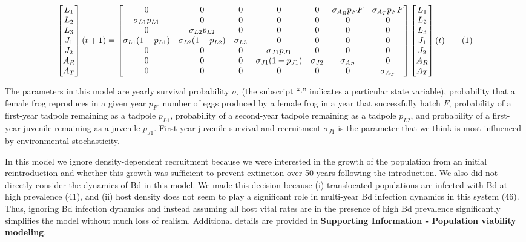 \documentclass[9pt,twocolumn,twoside,lineno]{pnas-new}
\begin{document}
{\begin{figure}\[
\begin{bmatrix}
L_1 \\
L_2 \\
L_3 \\
J_1 \\
J_2 \\
A_R \\ 
A_T
\end{bmatrix}(t + 1) = 
\begin{bmatrix}
  0 & 0 & 0 & 0 & 0 & \sigma_{A_R} p_F F & \sigma_{A_T} p_F F \\
  \sigma_{L1} p_{L1} & 0 & 0 & 0 & 0 & 0 & 0 \\
  0 & \sigma_{L2} p_{L2} & 0 & 0 & 0 & 0 & 0\\
  \sigma_{L1} (1 - p_{L1}) & \sigma_{L2} (1 - p_{L2}) & \sigma_{L3} & 0 & 0 & 0 & 0 \\
  0 & 0 & 0 & \sigma_{J1} p_{J1} & 0 & 0 & 0 \\
  0 & 0 & 0 & \sigma_{J1} (1 - p_{J1}) & \sigma_{J2}  & \sigma_{A_R} & 0 \\
  0 & 0 & 0 & 0 & 0 & 0 & \sigma_{A_T} 
\end{bmatrix} \begin{bmatrix}
L_1 \\
L_2 \\
L_3 \\
J_1 \\
J_2 \\
A_R \\
A_T \\
\end{bmatrix}(t)\numberthis \label{eqn:matrix} 
\]\end{figure}

The parameters in this model are yearly survival probability
\(\sigma_{\cdot}\) (the subscript ``\(\cdot\)'' indicates a particular
state variable), probability that a female frog reproduces in a given
year \(p_F\), number of eggs produced by a female frog in a year that
successfully hatch \(F\), probability of a first-year tadpole remaining
as a tadpole \(p_{L1}\), probability of a second-year tadpole remaining
as a tadpole \(p_{L2}\), and probability of a first-year juvenile
remaining as a juvenile \(p_{J1}\). First-year juvenile survival and
recruitment \(\sigma_{J1}\) is the parameter that we think is most
influenced by environmental stochasticity.

In this model we ignore density-dependent recruitment because we were
interested in the growth of the population from an initial
reintroduction and whether this growth was sufficient to prevent
extinction over 50 years following the introduction. We also did not
directly consider the dynamics of Bd in this model. We made this
decision because (i) translocated populations are infected with Bd at
high prevalence (41), and (ii) host density does not seem to play a
significant role in multi-year Bd infection dynamics in this system
(46). Thus, ignoring Bd infection dynamics and instead assuming all host
vital rates are in the presence of high Bd prevalence significantly
simplifies the model without much loss of realism. Additional details
are provided in \textbf{Supporting Information - Population viability
modeling}.

}
\end{document}
